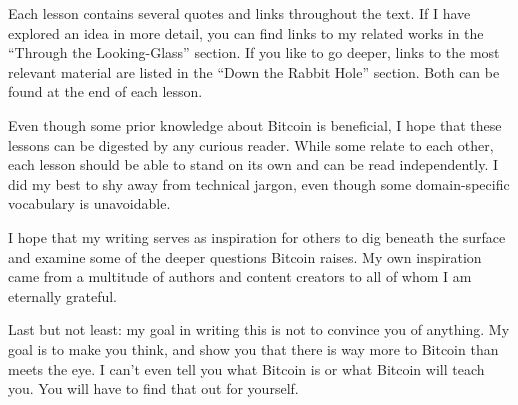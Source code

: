 Each lesson contains several quotes and links throughout the text. If I have
explored an idea in more detail, you can find links to my related works in the
``Through the Looking-Glass'' section. If you like to go deeper, links to the most
relevant material are listed in the ``Down the Rabbit Hole'' section. Both can be
found at the end of each lesson.

Even though some prior knowledge about Bitcoin is beneficial, I hope that these
lessons can be digested by any curious reader. While some relate to each other,
each lesson should be able to stand on its own and can be read independently. I
did my best to shy away from technical jargon, even though some domain-specific
vocabulary is unavoidable.

I hope that my writing serves as inspiration for others to dig beneath the
surface and examine some of the deeper questions Bitcoin raises. My own
inspiration came from a multitude of authors and content creators to all of whom
I am eternally grateful.

Last but not least: my goal in writing this is not to convince you of anything.
My goal is to make you think, and show you that there is way more to Bitcoin
than meets the eye. I can’t even tell you what Bitcoin is or what Bitcoin will
teach you. You will have to find that out for yourself.


%
%
%
